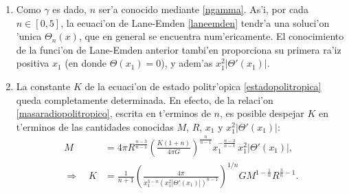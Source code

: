 \begin{enumerate}
 \item Como $\gamma$ es dado, $n$ ser'a conocido mediante \eqref{ngamma}. As'i, por cada $n\in[0,5]$, la ecuaci'on de Lane-Emden \eqref{laneemden} tendr'a una soluci'on 'unica $\Theta_n(x)$, que en general se encuentra num'ericamente. El conocimiento de la funci'on de Lane-Emden anterior tambi'en proporciona su primera ra'iz positiva $x_1$ (en donde $\Theta(x_1)=0$), y adem'as $x_1^2\left|\Theta'(x_1)\right|$.
\item La constante $K$ de la ecuaci'on de estado politr'opica \eqref{estadopolitropica} queda completamente determinada. En efecto, de la relaci'on \eqref{masaradiopolitropico}, escrita en t'erminos de $n$, es posible despejar $K$ en t'erminos de las cantidades conocidas $M$, $R$, $x_1$ y $x_1^2\left|\Theta'(x_1)\right|$:
\begin{align}
M&=4\pi R^{\frac{n-3}{n-1}}\left(\frac{K(1+n)}{4\pi G}\right)^{\frac{n}{n-1}}x_1^{-\frac{n-3}{n-1}}\,x_1^2\left|\Theta'(x_1)\right|,\\
\Rightarrow\quad K&=\frac{1}{n+1}\left(\frac{4\pi}{x_1^{3-n} \left(x_1^2\left|\Theta'(x_1)\right|\right)^{n-1}}\right)^{1/n}GM^{1-\frac{1}{n}}R^{\frac{3}{n}-1}.\label{kpolitropico}
\end{align}


\end{enumerate}
